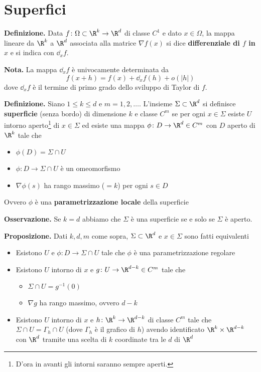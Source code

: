 \section{Superfici}

\textbf{Definizione.} Data $f \colon \Omega \subset \R^k \to \R^d$ di classe $C^1$ e dato $x \in \Omega$, la mappa lineare da $\R^k$ a $\R^d$ associata alla matrice $\nabla f(x)$ si dice \textbf{differenziale di $f$ in $x$} e si indica con $\dd_x f$.

\textbf{Nota.} La mappa $\dd_x f$ è univocamente determinata  da
%
$$
	f(x+h) = f(x) + \dd_x f(h) + o(|h|)
$$
%
dove $\dd_x f$ è il termine di primo grado dello sviluppo di Taylor di $f$.

\textbf{Definizione.} Siano $1 \leq k \leq d$ e $m = 1,2,\ldots$. L'insieme $\Sigma \subset \R^d$ si definisce \textbf{superficie} (senza bordo) di dimensione $k$ e classe $C^m$ se per ogni $x \in \Sigma$ esiste $U$ intorno aperto\footnote{D'ora in avanti gli intorni saranno sempre aperti.} di $x \in \Sigma$ ed esiste una mappa $\phi \colon D \to \R^d \in C^m$ con $D$ aperto di $\R^k$ tale che
\begin{itemize}

	\item $\phi(D) = \Sigma \cap U$

	\item $\phi \colon D \to \Sigma \cap U$ è un omeomorfismo

	\item $\nabla \phi(s)$ ha rango massimo ($=k$) per ogni $s \in D$

\end{itemize}
Ovvero $\phi$ è una \textbf{parametrizzazione locale} della superficie

\textbf{Osservazione.} Se $k = d$ abbiamo che $\Sigma$ è una superficie se e solo se $\Sigma$ è aperto.

\textbf{Proposizione.} Dati $k,d,m$ come sopra, $\Sigma \subset \R^d$ e $x \in \Sigma$ sono fatti equivalenti
\begin{itemize}

	\item Esistono $U$ e $\phi \colon D \to \Sigma \cap U$ tale che $\phi$ è una parametrizzazione regolare


	\item Esistono $U$ intorno di $x$ e $g \colon U \to \R^{d-k} \in C^m$ tale che 
	\begin{itemize}

		\item $\Sigma \cap U = g^{-1}(0)$

		\item $\nabla g$ ha rango massimo, ovvero $d-k$ 

	\end{itemize}


	\item Esistono $U$ intorno di $x$ e $h \colon \R^k \to \R^{d-k}$ di classe $C^m$ tale che $\Sigma \cap U = \Gamma_h \cap U$ (dove $\Gamma_h$ è il grafico di $h$) avendo identificato $\R^k \times \R^{d-k}$ con $\R^d$ tramite una scelta di $k$ coordinate tra le $d$ di $\R^d$

\end{itemize}

